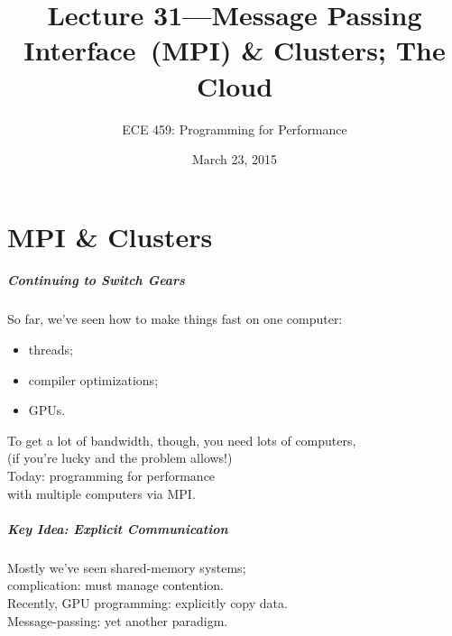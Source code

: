 \documentclass[aspectratio=43]{beamer}
\title{Lecture 31---Message Passing Interface~(MPI) \& Clusters; The Cloud}
\subtitle{ECE 459: Programming for Performance}
\date{March 23, 2015}
\newenvironment{changemargin}[1]{%
  \begin{list}{}{%
    \setlength{\topsep}{0pt}%
    \setlength{\leftmargin}{#1}%
    \setlength{\rightmargin}{1em}
    \setlength{\listparindent}{\parindent}%
    \setlength{\itemindent}{\parindent}%
    \setlength{\parsep}{\parskip}%
  }%
  \item[]}{\end{list}}
\begin{document}
\begin{frame}[plain]
  \titlepage
\end{frame}

\part{MPI \& Clusters}
\frame{\partpage}


\begin{frame}
  \frametitle{Continuing to Switch Gears}

  \begin{changemargin}{1cm}

  So far, we've seen how to make things fast on one computer:
\begin{itemize}
\item threads;
\item compiler optimizations;
\item GPUs.
\end{itemize}
  To get a lot of bandwidth, though, you need lots of computers, \\
   \qquad (if you're lucky and the problem allows!)\\[1em]

  Today: programming for performance \\ \qquad with multiple computers via MPI.

  \end{changemargin}
\end{frame}

\begin{frame}
  \frametitle{Key Idea: Explicit Communication}

  \begin{changemargin}{2cm}
  Mostly we've seen shared-memory systems;\\
  \qquad complication: must manage contention.\\[1em]

  Recently, GPU programming: explicitly copy data.\\[1em]

  Message-passing: yet another paradigm.

  \end{changemargin}
\end{frame}
\end{document}
